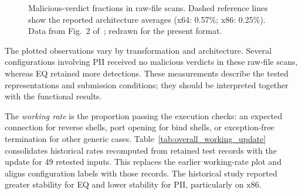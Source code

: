 \documentclass[runningheads]{llncs}
\providecommand{\Description}[1]{}
\begin{document}
\begin{figure}[tbp]
\Description{Malicious-verdict fractions in raw-file scans. Dashed reference lines show the reported architecture averages (x64: 0.57\%; x86: 0.25\%). Orange circles identify x64 and blue squares identify x86.}
\caption{Malicious-verdict fractions in raw-file scans. Dashed reference lines show the reported architecture averages (x64: 0.57\%; x86: 0.25\%). Data from Fig.~2 of~\cite{zone_secrypt_2026}; redrawn for the present format.}
\label{fig:all_payloads}
\end{figure}

The plotted observations vary by transformation and architecture. Several configurations involving PII received no malicious verdicts in these raw-file scans, whereas EQ retained more detections. These measurements describe the tested representations and submission conditions; they should be interpreted together with the functional results.

\label{par:working_rate}
The \emph{working rate} is the proportion passing the execution checks:
an expected connection for reverse shells, port opening for bind shells,
or exception-free termination for other generic cases.
Table~\ref{tab:overall_working_update} consolidates historical rates
recomputed from retained test records with the update for 49 retested
inputs. This replaces the earlier working-rate plot and aligns
configuration labels with those records. The historical study reported
greater stability for EQ and lower stability for PII, particularly on x86.
\end{document}
